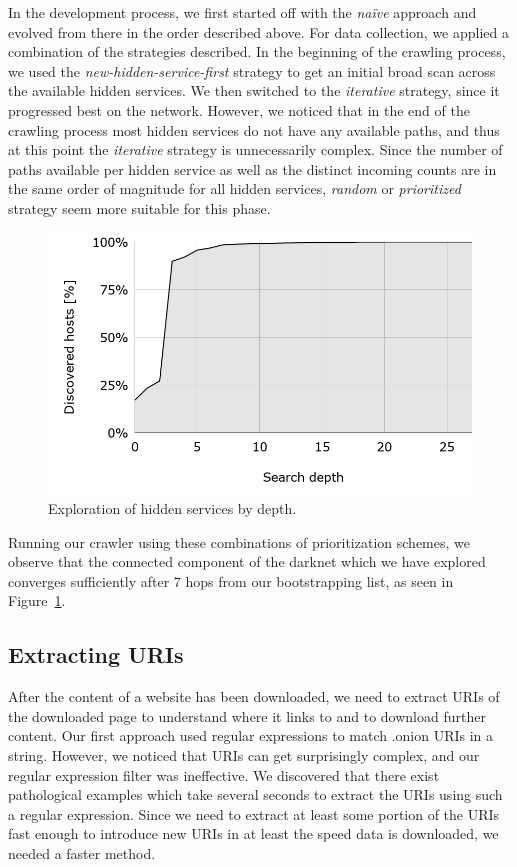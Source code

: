 In the development process, we first started off with the \emph{naïve} approach and evolved from there in the order described above. For data collection, we applied a combination of the strategies described. In the beginning of the crawling process, we used the  \emph{new-hidden-service-first} strategy to get an initial broad scan across the available hidden services. We then switched to the \emph{iterative} strategy, since it progressed best on the network. However, we noticed that in the end of the crawling process most hidden services do not have any available paths, and thus at this point the \emph{iterative} strategy is unnecessarily complex. Since the number of paths available per hidden service as well as the distinct incoming counts are in the same order of magnitude for all hidden services,  \emph{random} or  \emph{prioritized} strategy seem more suitable for this phase.

\begin{figure}[H]
    \centering
    \includegraphics[width=\linewidth]{images/PercentageByDepth.png}
    \caption{Exploration of hidden services by depth.}
    \label{fig:percentageByDepth}
\end{figure}

Running our crawler using these combinations of prioritization schemes, we observe that the connected component of the darknet which we have explored converges sufficiently after 7 hops from our bootstrapping list, as seen in Figure~\ref{fig:percentageByDepth}.

\subsection{Extracting URIs}

After the content of a website has been downloaded, we need to extract URIs of the downloaded page to understand where it links to and to download further content. Our first approach used regular expressions to match .onion URIs in a string. However, we noticed that URIs can get surprisingly complex, and our regular expression filter was ineffective. We discovered that there exist pathological examples which take several seconds to extract the URIs using such a regular expression. Since we need to extract at least some portion of the URIs fast enough to introduce new URIs in at least the speed data is downloaded, we needed a faster method.

